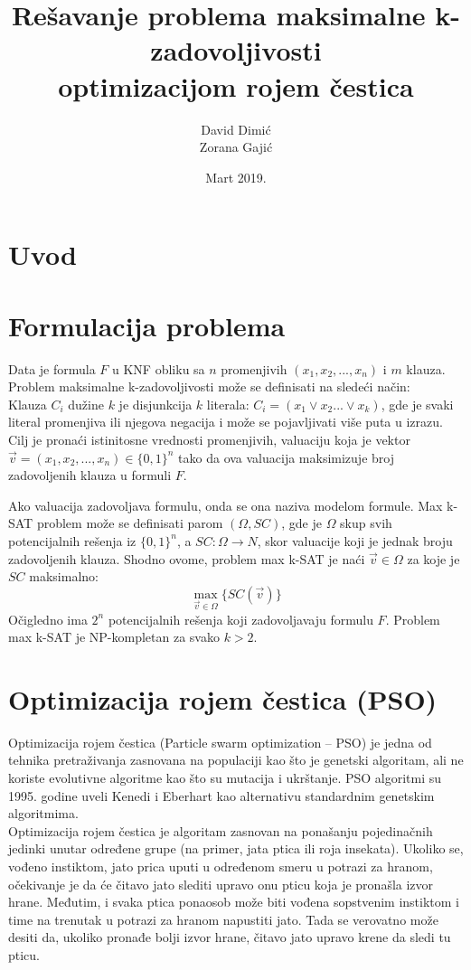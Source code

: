 \documentclass{article}
\title{Rešavanje problema maksimalne k-zadovoljivosti\\ optimizacijom rojem čestica}
\author{David Dimić\\ Zorana Gajić}
\date{Mart 2019.}
\begin{document}
\maketitle  
\newpage
\tableofcontents
\newpage

\section{Uvod}
\section{Formulacija problema}
Data je formula $F$ u KNF obliku sa $n$ promenjivih $(x_1, x_2, ..., x_n)$ i $m$ klauza. Problem maksimalne k-zadovoljivosti može se definisati na sledeći način:\\ 

Klauza $C_i$ dužine $k$ je disjunkcija $k$ literala: 
$C_i = (x_1  \vee x_2 ... \vee x_k)$, gde je svaki literal promenjiva ili njegova negacija i može se pojavljivati više puta u izrazu.
Cilj je pronaći istinitosne vrednosti promenjivih, valuaciju koja je vektor $\vec{v} = (x_1, x_2, ..., x_n) \in \{ 0,1 \}^n$ tako da ova valuacija maksimizuje broj zadovoljenih klauza u formuli $F$. 

Ako valuacija zadovoljava formulu, onda se ona naziva modelom formule. Max k-SAT problem može se definisati parom $(\Omega, SC)$, gde je $\Omega$ skup svih potencijalnih rešenja iz $\{0,1\}^n$, a $SC:\Omega \rightarrow N$, skor valuacije koji je jednak broju zadovoljenih klauza. Shodno ovome, problem max k-SAT je naći $\vec{v} \in \Omega$ za koje je $SC$ maksimalno:
$$\max_{\vec{v} \in \Omega}\{SC(\vec{v})\}$$
Očigledno ima $2^n$ potencijalnih rešenja koji zadovoljavaju formulu $F$. Problem max k-SAT je NP-kompletan za svako $k>2$.

\section{Optimizacija rojem čestica (PSO)}
Optimizacija rojem čestica (Particle swarm optimization – PSO) je jedna od tehnika pretraživanja zasnovana na populaciji kao što je genetski algoritam, ali ne koriste evolutivne algoritme kao što su mutacija i ukrštanje.
PSO algoritmi su 1995. godine uveli Kenedi i Eberhart kao alternativu standardnim genetskim algoritmima. \\

Optimizacija rojem čestica je algoritam zasnovan na ponašanju pojedinačnih jedinki unutar određene grupe (na primer, jata ptica ili roja insekata). Ukoliko se, vođeno instiktom, jato prica uputi u određenom smeru u potrazi za hranom, očekivanje je da će čitavo jato slediti upravo onu pticu koja je pronašla izvor hrane. Međutim, i svaka ptica ponaosob može biti vođena sopstvenim instiktom i time na trenutak u potrazi za hranom napustiti jato. Tada se verovatno može desiti da, ukoliko pronađe bolji izvor hrane, čitavo jato upravo krene da sledi tu pticu. \\
\end{document}
